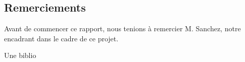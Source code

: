\documentclass[a4paper,11pt,twoside]{article}
\begin{document}
\cleardoublepage


\thispagestyle{empty} %
\subsection*{Remerciements}
Avant de commencer ce rapport, nous tenions à remercier M. Sanchez, notre encadrant dans le cadre de ce projet.
\clearpage

\thispagestyle{empty} %
\setcounter{secnumdepth}{3}
\tableofcontents
\clearpage

\setcounter{page}{1}



\clearpage

\clearpage

\clearpage

\clearpage


\clearpage


Une biblio
\clearpage

\clearpage
\appendix
\renewcommand{\stctitle}{}                          %

\renewcommand{\stcSSfont}{}                         %
\clearpage

\secttoc

\clearpage
{}

\renewcommand\thesubsection{A\arabic{subsection}}   %



\end{document}
